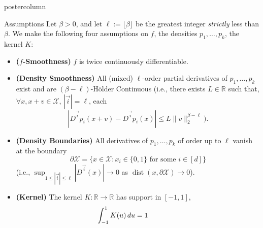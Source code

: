 \documentclass[final,hyperref={pdfpagelabels=false}]{beamer}
\newcommand{\R}{\mathbb{R}}
\newcommand{\X}{\mathcal{X}}
\newcommand{\dist}{\operatorname{dist}}
\newcommand{\vi}{{\vec i}}
\begin{document}
\begin{frame}
\begin{columns}
\begin{column}{.32\textwidth}
\begin{beamercolorbox}[center,wd=\textwidth]{postercolumn}
\begin{minipage}[T]{.95\textwidth}
{%
            \vfill
            \begin{block}{Assumptions}
              {\footnotesize
              Let $\beta > 0$, and let $\ell := \lfloor \beta \rfloor$ be
              the greatest integer \emph{strictly} less than $\beta$. We make
              the following four assumptions on $f$, the densities
              $p_1,\dots,p_k$, the kernel $K$:\\}
              \begin{itemize}
              \item {\bf\footnotesize ($f$-Smoothness)} $f$ is twice
              continuously differentiable.
              \item {\bf\footnotesize (Density Smoothness)} All (mixed)
              $\ell$-order partial derivatives of $p_1,\dots,p_k$ exist and are
              $(\beta - \ell)$-H\"older Continuous (i.e., there exists
              $L \in \R$ such that, $\forall x, x + v \in \X$, $|\vi| = \ell$,
              each
                    \[|D^\vi p_i(x + v) - D^\vi p_i(x)|
                                        \leq L\|v\|_2^{\beta - \ell}\mbox{)}.\]
              \item {\bf\footnotesize (Density Boundaries)} All derivatives of
                    $p_1,\dots,p_k$ of order up to $\ell$ vanish at the boundary
                    \[\partial\X = \{x \in \X : x_i \in \{0,1\}
                                            \mbox{ for some } i \in [d]\}\]
                    (i.e., $\sup_{1 \leq |\vi| \leq \ell} |D^\vi(x)| \to 0$
                    as $\dist(x,\partial\X) \to 0$).
                    \vspace{1cm}
              \item {\bf\footnotesize (Kernel)} The kernel
                    $K : \R \to \R$ has support in $[-1,1]$,
                    \[\hspace{-15mm}\int_{-1}^1 K(u) \, du = 1
\]
\end{itemize}
\end{block}}
\end{minipage}
\end{beamercolorbox}
\end{column}
\end{columns}
\end{frame}
\end{document}
